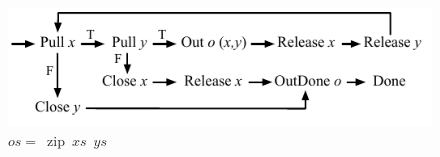 \begin{figure}
%
%
%
%
%
%

\centering
\hspace{-3ex}
\includegraphics{machine/zip}
\caption{$os =$~zip~$xs$~$ys$}
\label{fig:com:zip}
\end{figure}


